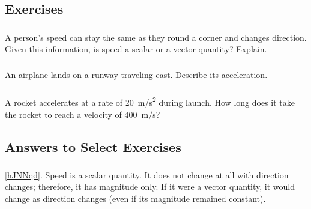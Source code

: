 \documentclass[main-ap-physics.tex]{subfiles}
\begin{document}


\clearpage

\subsection{Exercises}

\subsubsection*{} %

\begin{exercise} \label{hJNNqd}
    A person's speed can stay the same as they round a corner and changes direction. Given this information, is speed a scalar or a vector quantity? Explain.
\end{exercise}

\subsubsection*{} %

\begin{exercise} \label{OKpKf5}
    An airplane lands on a runway traveling east. Describe its acceleration.
\end{exercise}

\subsubsection*{} %

\begin{exercise} \label{HbNHjj}
A rocket accelerates at a rate of \SI{20}{m/s^2} during launch. How long does it take the rocket to reach a velocity of \SI{400}{m/s}?
\end{exercise}

\subsection{Answers to Select Exercises}

\subsubsection*{} %

\ref{hJNNqd}. Speed is a scalar quantity. It does not change at all with direction changes; therefore, it has magnitude only. If it were a vector quantity, it would change as direction changes (even if its magnitude remained constant).\\
\end{document}
